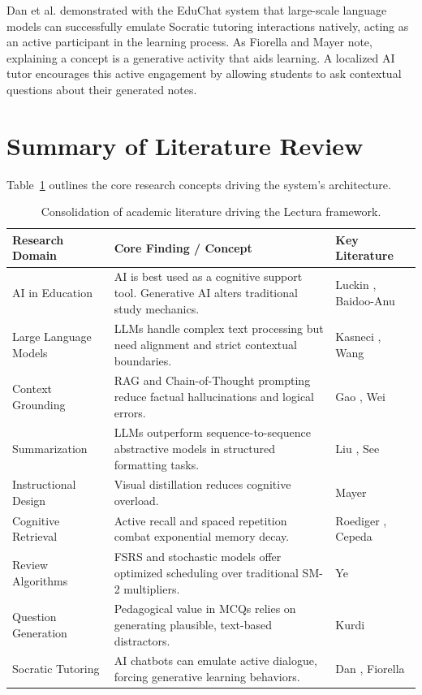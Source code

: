 Dan et al. \cite{dan2023educhat} demonstrated with the EduChat system that large-scale language models can successfully emulate Socratic tutoring interactions natively, acting as an active participant in the learning process. As Fiorella and Mayer \cite{fiorella2015learning} note, explaining a concept is a generative activity that aids learning. A localized AI tutor encourages this active engagement by allowing students to ask contextual questions about their generated notes.

\section{Summary of Literature Review}
Table~\ref{tab:lit_summary} outlines the core research concepts driving the system's architecture.

\begin{table}[htbp]
\centering
\begin{tabular}{|l|p{5.5cm}|l|}
\hline
\textbf{Research Domain} & \textbf{Core Finding / Concept} & \textbf{Key Literature} \\ \hline
AI in Education & AI is best used as a cognitive support tool. Generative AI alters traditional study mechanics. & Luckin \cite{luckin2016intelligence}, Baidoo-Anu \cite{baidoo2023education} \\ \hline
Large Language Models & LLMs handle complex text processing but need alignment and strict contextual boundaries. & Kasneci \cite{kasneci2023chatgpt}, Wang \cite{wang2024large} \\ \hline
Context Grounding & RAG and Chain-of-Thought prompting reduce factual hallucinations and logical errors. & Gao \cite{gao2023retrieval}, Wei \cite{wei2022chain} \\ \hline
Summarization & LLMs outperform sequence-to-sequence abstractive models in structured formatting tasks. & Liu \cite{liu2023summary}, See \cite{see2017get} \\ \hline
Instructional Design & Visual distillation reduces cognitive overload. & Mayer \cite{mayer2014cambridge} \\ \hline
Cognitive Retrieval & Active recall and spaced repetition combat exponential memory decay. & Roediger \cite{roediger2006test}, Cepeda \cite{cepeda2006distributed} \\ \hline
Review Algorithms & FSRS and stochastic models offer optimized scheduling over traditional SM-2 multipliers. & Ye \cite{ye2022stochastic} \\ \hline
Question Generation & Pedagogical value in MCQs relies on generating plausible, text-based distractors. & Kurdi \cite{kurdi2020systematic} \\ \hline
Socratic Tutoring & AI chatbots can emulate active dialogue, forcing generative learning behaviors. & Dan \cite{dan2023educhat}, Fiorella \cite{fiorella2015learning} \\ \hline
\end{tabular}
\vspace{6pt}
\caption{Consolidation of academic literature driving the Lectura framework.}
\label{tab:lit_summary}
\end{table}